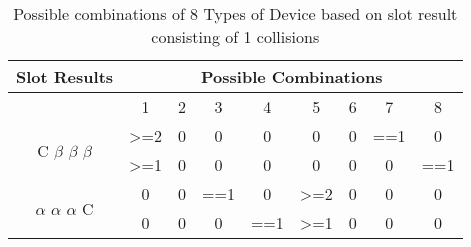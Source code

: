 \documentclass[fleqn]{article}
\begin{document}
\begin{table}[]
\centering
\label{my-label}
\begin{tabular}{|c|c|c|c|c|c|c|c|c|}
\hline
Slot Results                                  & \multicolumn{8}{c|}{Possible Combinations}                          \\ \hline
                                              & 1                & 2 & 3   & 4   & 5                & 6 & 7   & 8   \\ \hline
\multirow{2}{*}{C $\beta$ $\beta$ $\beta$}    & \textgreater{}=2 & 0 & 0   & 0   & 0                & 0 & ==1 & 0   \\ \cline{2-9} 
                                              & \textgreater{}=1 & 0 & 0   & 0   & 0                & 0 & 0   & ==1 \\ \hline
\multirow{2}{*}{$\alpha$ $\alpha$ $\alpha$ C} & 0                & 0 & ==1 & 0   & \textgreater{}=2 & 0 & 0   & 0   \\ \cline{2-9} 
                                              & 0                & 0 & 0   & ==1 & \textgreater{}=1 & 0 & 0   & 0   \\ \hline
\end{tabular}
\caption{Possible combinations of 8 Types of Device based on slot result consisting of 1 collisions}
\label{Tab8_2C}
\end{table}
\end{document}
